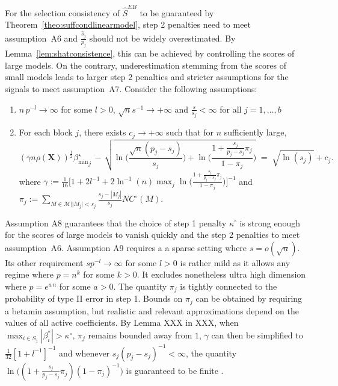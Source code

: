 \documentclass[aos]{imsart}
\theoremstyle{plain}
\newcommand{\bs}{\boldsymbol}
\begin{document}
For the selection consistency of $\hat{S}^{EB}$ to be guaranteed by Theorem~\ref{theo:suffcondlinearmodel}, step 2 penalties need to meet assumption~A6 and $\frac{\widehat{s}_j}{p_j}$ should not be widely overestimated. By Lemma~\ref{lem:shatconsistence}, this can be achieved by controlling the scores of large models. On the contrary, underestimation stemming from the scores of small models leads to larger step 2 penalties and stricter assumptions for the signals to meet assumption~A7. Consider the following assumptions:
\begin{enumerate}[start=8,label={(A\arabic*)}]
    \item $n \, p^{-l} \to \infty$ for some $l>0$, $\sqrt{n}s^{-1} \to +\infty$ and $\frac{s}{s_j}<\infty$ for all $j=1,\ldots,b$\\
\item For each block $j$, there exists $c_{j}\to +\infty$ such that for $n$ sufficiently large, %
    \begin{equation*}
        (\gamma n\rho(\bs X))^{\frac{1}{2}}{\beta_{\min}^{\star}}_j \,- \,\sqrt{\ln\bigg(\frac{\sqrt{n}(p_j-s_j)}{s_j}\bigg)+\ln\bigg(\frac{1+\frac{s_j}{p_j-s_j}\pi_j}{1-\pi_j}\bigg)} \;=\; \sqrt{\ln(s_j)} + c_{j} .
    \end{equation*}
where $\gamma:=\frac{1}{16}\bigg[1+2l^{-1}+2\ln^{-1}(n)\max_j\ln\bigg(\frac{1+\frac{s_j}{p_j-s_j}\pi_j}{1-\pi_j}\bigg)\bigg]^{-1}$ and \\
$\pi_j:=\sum_{M \in \mathcal{M} | |M_j| < s_j}\frac{s_j-|M_j|}{s_j}NC^{\circ}(M)$.
\end{enumerate}

Assumption A8 guarantees that the choice of step 1 penalty $\kappa^{\circ}$ is strong enough for the scores of large models to vanish quickly and the step 2 penalties to meet assumption~A6. Assumption A9 requires a a sparse setting where $s=o(\sqrt{n})$. Its other requirement $sp^{-l}\to \infty$ for some $l>0$ is rather mild as it allows any regime where $p=n^k$ for some $k>0$. It excludes nonetheless ultra high dimension where $p=e^{a\,n}$ for some $a>0$. The quantity $\pi_j$ is tightly connected to the probability of type II error in step 1. Bounds on $\pi_j$ can be obtained by requiring a betamin assumption, but realistic and relevant approximations depend on the values of all active coefficients. By Lemma XXX in XXX, when $\max_{i\in S_j}|\beta^*_i| > \kappa^{\circ}$, $\pi_j$ remains bounded away from $1$, $\gamma$ can then be simplified to $\frac{1}{32}[1+l^{-1}]^{-1}$ and whenever $s_j(p_j-s_j)^{-1}<\infty$, the quantity $\ln\big((1+\frac{s_j}{p_j-s_j}\pi_j)(1-\pi_j)^{-1}\big)$ is guaranteed to be finite . 
\end{document}
